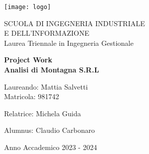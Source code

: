 \begin{titlepage}
    \begin{center}
        \texttt{[image: logo]}

        \vspace{1cm}        
        
        SCUOLA DI INGEGNERIA INDUSTRIALE \\ E DELL'INFORMAZIONE
        \vspace{0.5cm}
        \\ Laurea Triennale in Ingegneria Gestionale
        \vspace{2cm}
        
        \huge\textbf{Project Work} \\
        \huge\textbf{Analisi di Montagna S.R.L}
        
        \vspace{2cm}
        
        \large{Laureando: Mattia Salvetti}\\
        \large{Matricola: 981742}
        
        \vspace{1.5cm}
        
        \large{Relatrice: Michela Guida}
        
        \vspace{0.5cm}
        
        \large{Alumnus: Claudio Carbonaro}
        
        \vfill
        
        
        \vspace{1cm}

        \large{Anno Accademico 2023 - 2024}

    \end{center}
\end{titlepage}
